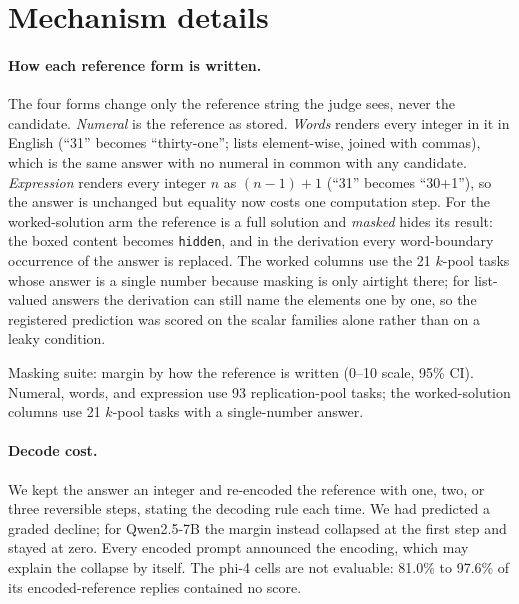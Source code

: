 \FloatBarrier
\section{Mechanism details}
\label{app:mechanism}

\paragraph{How each reference form is written.} The four forms change only the reference string the judge sees, never the candidate. \emph{Numeral} is the reference as stored. \emph{Words} renders every integer in it in English (``31'' becomes ``thirty-one''; lists element-wise, joined with commas), which is the same answer with no numeral in common with any candidate. \emph{Expression} renders every integer $n$ as $(n{-}1){+}1$ (``31'' becomes ``30+1''), so the answer is unchanged but equality now costs one computation step. For the worked-solution arm the reference is a full solution and \emph{masked} hides its result: the boxed content becomes \texttt{hidden}, and in the derivation every word-boundary occurrence of the answer is replaced. The worked columns use the 21 $k$-pool tasks whose answer is a single number because masking is only airtight there; for list-valued answers the derivation can still name the elements one by one, so the registered prediction was scored on the scalar families alone rather than on a leaky condition.

\begin{table}[htbp]
\centering
\caption{Masking suite: margin by how the reference is written (0--10 scale, 95\% CI). Numeral, words, and expression use 93 replication-pool tasks; the worked-solution columns use 21 $k$-pool tasks with a single-number answer.\pre}
\label{tab:masking}
\footnotesize
\setlength{\tabcolsep}{3pt}
\begin{adjustbox}{max width=\linewidth}\end{adjustbox}
\end{table}

\paragraph{Decode cost.}
We kept the answer an integer and re-encoded the reference with one, two, or three reversible steps, stating the decoding rule each time. We had predicted a graded decline; for Qwen2.5-7B the margin instead collapsed at the first step and stayed at zero. Every encoded prompt announced the encoding, which may explain the collapse by itself. The phi-4 cells are not evaluable: 81.0\% to 97.6\% of its encoded-reference replies contained no score.

